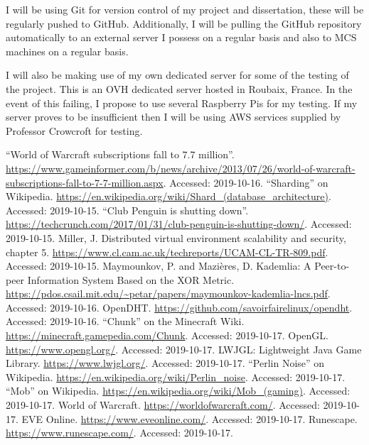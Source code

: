 \documentclass[12pt,a4paper]{article}
\begin{document}
	I will be using Git for version control of my project and dissertation, these will be regularly pushed to GitHub. Additionally, I will be pulling the GitHub repository automatically to an external server I possess on a regular basis and also to MCS machines on a regular basis.
	
	I will also be making use of my own dedicated server for some of the testing of the project. This is an OVH dedicated server hosted in Roubaix, France. In the event of this failing, I propose to use several Raspberry Pis for my testing. If my server proves to be insufficient then I will be using AWS services supplied by Professor Crowcroft for testing.
	
	\begin{thebibliography}{9}
		 ``World of Warcraft subscriptions fall to 7.7 million''. \url{https://www.gameinformer.com/b/news/archive/2013/07/26/world-of-warcraft-subscriptions-fall-to-7-7-million.aspx}. Accessed: 2019-10-16.
		 ``Sharding'' on Wikipedia. \url{https://en.wikipedia.org/wiki/Shard_(database_architecture)}. Accessed: 2019-10-15.
		 ``Club Penguin is shutting down''. \url{https://techcrunch.com/2017/01/31/club-penguin-is-shutting-down/}. Accessed: 2019-10-15.
		 Miller, J. Distributed virtual environment
		scalability and security, chapter 5. \url{https://www.cl.cam.ac.uk/techreports/UCAM-CL-TR-809.pdf}. Accessed: 2019-10-15.
		 Maymounkov, P. and Mazières, D. Kademlia: A Peer-to-peer Information System Based on the XOR Metric. \url{https://pdos.csail.mit.edu/~petar/papers/maymounkov-kademlia-lncs.pdf}. Accessed: 2019-10-16.
		 OpenDHT. \url{https://github.com/savoirfairelinux/opendht}. Accessed: 2019-10-16.
		 ``Chunk'' on the Minecraft Wiki. \url{https://minecraft.gamepedia.com/Chunk}. Accessed: 2019-10-17.
		 OpenGL. \url{https://www.opengl.org/}. Accessed: 2019-10-17.
		 LWJGL: Lightweight Java Game Library. \url{https://www.lwjgl.org/}. Accessed: 2019-10-17.
		 ``Perlin Noise'' on Wikipedia. \url{https://en.wikipedia.org/wiki/Perlin_noise}. Accessed: 2019-10-17.
		 ``Mob'' on Wikipedia. \url{https://en.wikipedia.org/wiki/Mob_(gaming)}. Accessed: 2019-10-17.
		 World of Warcraft. \url{https://worldofwarcraft.com/}. Accessed: 2019-10-17.
		 EVE Online. \url{https://www.eveonline.com/}. Accessed: 2019-10-17.
		 Runescape. \url{https://www.runescape.com/}. Accessed: 2019-10-17.
	\end{thebibliography}
\end{document}

